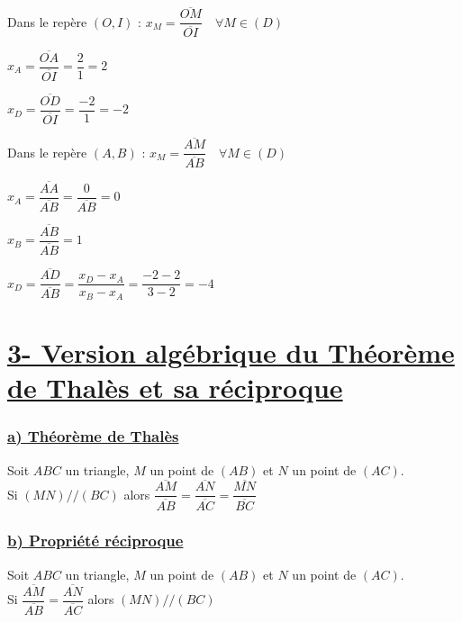 \documentclass[12pt,a4paper]{article}
\begin{document}
\medskip

Dans le repère $(O, I)$ : $x_M = \dfrac{\overline{OM}}{\overline{OI}} \quad \forall M \in (D)$

\medskip

$x_A = \dfrac{\overline{OA}}{\overline{OI}} = \dfrac{2}{1} = 2$

\smallskip

$x_D = \dfrac{\overline{OD}}{\overline{OI}} = \dfrac{-2}{1} = -2$

\medskip

Dans le repère $(A, B)$ : $x_M = \dfrac{\overline{AM}}{\overline{AB}} \quad \forall M \in (D)$

\medskip

$x_A = \dfrac{\overline{AA}}{\overline{AB}} = \dfrac{0}{\overline{AB}} = 0$

\smallskip

$x_B = \dfrac{\overline{AB}}{\overline{AB}} = 1$

\smallskip

$x_D = \dfrac{\overline{AD}}{\overline{AB}} = \dfrac{x_D - x_A}{x_B - x_A} = \dfrac{-2 - 2}{3 - 2} = -4$

\section*{\centering \underline{\color{red}3- Version algébrique du Théorème de Thalès et sa réciproque}}

\subsubsection*{\centering \underline{\color{red} a) Théorème de Thalès}}

Soit $ABC$ un triangle, $M$ un point de $(AB)$ et $N$ un point de $(AC)$. \\
Si $(MN) // (BC)$ alors $\dfrac{\overline{AM}}{\overline{AB}} = \dfrac{\overline{AN}}{\overline{AC}} = \dfrac{\overline{MN}}{\overline{BC}}$

\subsubsection*{\centering \underline{\color{red} b) Propriété réciproque}}


Soit $ABC$ un triangle, $M$ un point de $(AB)$ et $N$ un point de $(AC)$. \\
Si $\dfrac{\overline{AM}}{\overline{AB}} = \dfrac{\overline{AN}}{\overline{AC}}$ alors $(MN) // (BC)$
\end{document}
